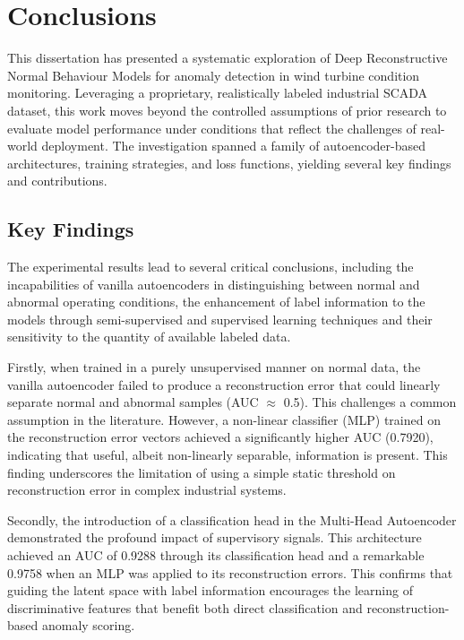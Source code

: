 \chapter{Conclusions}
\label{ch:conclusion}




\ifpdf
    \graphicspath{{6_conclusions/figures/}{6_conclusions/figures/}
            {6_conclusions/figures/}}
\else
    \graphicspath{{6_conclusions/figures/EPS/}{6_conclusions/figures/}}
\fi


This dissertation has presented a systematic exploration of Deep Reconstructive Normal Behaviour Models for anomaly detection in wind turbine condition monitoring.
Leveraging a proprietary, realistically labeled industrial SCADA dataset, this work moves beyond the controlled assumptions of prior research to evaluate model performance under conditions that reflect the challenges of real-world deployment.
The investigation spanned a family of autoencoder-based architectures, training strategies, and loss functions, yielding several key findings and contributions.


\section{Key Findings}
The experimental results lead to several critical conclusions, including the incapabilities of vanilla autoencoders in distinguishing between normal and abnormal operating conditions, the enhancement of label information to the models through semi-supervised and supervised learning techniques and their sensitivity to the quantity of available labeled data.

Firstly, when trained in a purely unsupervised manner on normal data, the vanilla autoencoder failed to produce a reconstruction error that could linearly separate normal and abnormal samples (AUC $\approx$ 0.5).
This challenges a common assumption in the literature.
However, a non-linear classifier (MLP) trained on the reconstruction error vectors achieved a significantly higher AUC (0.7920), indicating that useful, albeit non-linearly separable, information is present.
This finding underscores the limitation of using a simple static threshold on reconstruction error in complex industrial systems.

Secondly, the introduction of a classification head in the Multi-Head Autoencoder demonstrated the profound impact of supervisory signals.
This architecture achieved an AUC of 0.9288 through its classification head and a remarkable 0.9758 when an MLP was applied to its reconstruction errors.
This confirms that guiding the latent space with label information encourages the learning of discriminative features that benefit both direct classification and reconstruction-based anomaly scoring.

